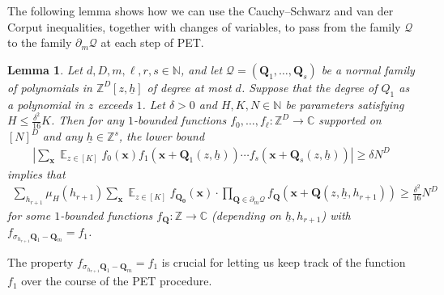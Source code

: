 \documentclass[11pt]{amsart}
\newtheorem{lemma}{Lemma}[section]
\theoremstyle{definition}
\DeclareMathOperator*{\E}{\mathbb{E}}
\newcommand{\C}{{\mathbb C}}
\newcommand{\N}{{\mathbb N}}
\newcommand{\Z}{{\mathbb Z}}
\newcommand{\CP}{{\mathcal P}}
\newcommand{\CQ}{{\mathcal Q}}
\newcommand{\bq}{{\mathbf{Q}}}
\newcommand{\q}{{\mathbf{Q}}}
\newcommand{\bx}{{\mathbf{x}}}
\newcommand{\uh}{{\underline{h}}}
\newcommand{\abs}[1]{\mathopen{}\left| #1\mathclose{}\right|}
\begin{document}
 
    The following lemma shows how we can use the Cauchy--Schwarz and van der Corput inequalities, together with changes of variables, to pass  from the family $\CQ$ to the family $\partial_m\CQ$ at each step of PET.
    \begin{lemma}\label{L: bounding averages in vdC}
        Let $d, D, m, \ell, r, s\in\N$, and let $\CQ = (\q_1, \ldots, \q_s)$ be a normal family of polynomials in $\Z^D[z,\uh]$ of degree at most $d$. Suppose that the degree of $Q_1$ as a polynomial in $z$ exceeds $1$.
        Let $\delta>0$ and $H, K, N\in\N$ be parameters satisfying 
        $H\leq \frac{\delta^2}{16}K$. Then for any $1$-bounded functions $f_0, \ldots, f_\ell:\Z^D\to\C$ supported on $[N]^D$ and any $\uh\in\Z^s$, the lower bound
        \begin{align*}
            \abs{\sum_{\bx}\E_{z\in[K]}
            f_0(\bx)f_1(\bx+\q_1(z,\uh))\cdots f_{s}(\bx+\q_s(z,\uh))} \geq \delta N^D
        \end{align*}
        implies that
        \begin{align*}
            \sum_{h_{r+1}}\mu_H(h_{r+1})\sum_{\bx}\E_{z\in[K]}f_{\mathbf{Q_0}}(\bx)\cdot \prod_{\bq\in\partial_m\CQ}f_{\bq}(\bx+\q(z,\uh, h_{r+1}))\geq \frac{\delta^2}{16}N^D
        \end{align*}
        for some $1$-bounded functions $f_\bq:\Z\to\C$ {(depending on $\uh, h_{r+1}$)} with $f_{\sigma_{h_{r+1}}\q_1 - \q_m} = f_1$. 
    \end{lemma}
    The property $f_{\sigma_{h_{r+1}}\q_1 - \q_m} = f_1$ is crucial for letting us keep track of the function $f_1$ over the course of the PET procedure.
\end{document}
